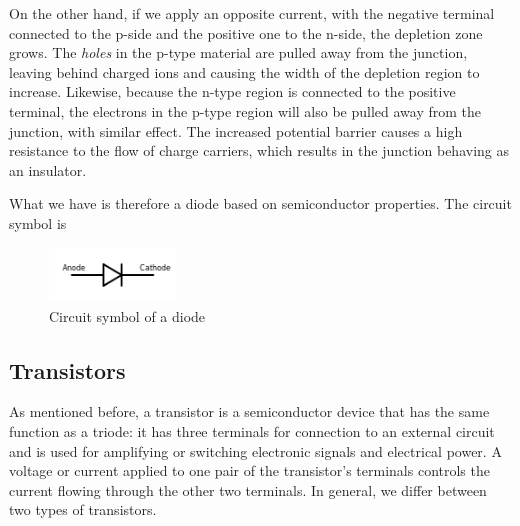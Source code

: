 \documentclass[11pt]{article}
\begin{document}
On the other hand, if we apply an opposite current, with the negative terminal connected to the p-side and the positive one to the n-side, the depletion zone grows. The \textit{holes} in the p-type material are pulled away from the junction, leaving behind charged ions and causing the width of the depletion region to increase. Likewise, because the n-type region is connected to the positive terminal, the electrons in the p-type region will also be pulled away from the junction, with similar effect. The increased potential barrier causes a high resistance to the flow of charge carriers, which results in the junction behaving as an insulator. 

What we have is therefore a diode based on semiconductor properties. The circuit symbol is 
\begin{figure}[H]
\centering
\includegraphics[width=0.3\textwidth]{diode_small}%
\caption{Circuit symbol of a diode}
\label{fig:diode_small}
\end{figure}

\subsection{Transistors}
As mentioned before, a transistor is a semiconductor device that has the same function as a triode: it has three terminals for connection to an external circuit and is used for amplifying or switching electronic signals and electrical power. A voltage or current applied to one pair of the transistor's terminals controls the current flowing through the other two terminals. In general, we differ between two types of transistors. 
\end{document}
